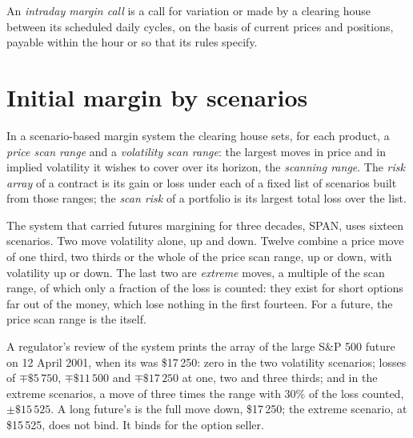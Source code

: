 \begin{definition}\label{def:m1:margin:intraday}
An \emph{intraday margin call} is a call for
variation or  made by a clearing house between its scheduled
daily cycles, on the basis of current prices and positions, payable within
the hour or so that its rules specify.
\end{definition}

\section{Initial margin by scenarios}

\begin{definition}\label{def:m1:margin:scan}
In a scenario-based margin system the clearing house sets, for each product,
a \emph{price scan range} and a \emph{volatility scan range}: the largest
moves in price and in implied volatility it wishes to cover over its
horizon, the \emph{scanning range}. The \emph{risk
array} of a contract is its gain or loss under each of a fixed list of
scenarios built from those ranges; the \emph{scan risk} of a portfolio is its
largest total loss over the list.
\end{definition}

The system that carried futures margining for three decades, SPAN, uses
sixteen scenarios. Two move volatility alone, up and down. Twelve combine a
price move of one third, two thirds or the whole of the price scan range, up
or down, with volatility up or down. The last two are \emph{extreme} moves, a
multiple of the scan range, of which only a fraction of the loss is counted:
they exist for short options far out of the money, which lose nothing in the
first fourteen. For a future, the price scan range is the 
itself.

\begin{example}\label{ex:m1:margin:array}
A regulator's review of the system prints the array of the large S\&P 500
future on 12 April 2001, when its  was \$17\,250: zero in
the two volatility scenarios; losses of $\mp\$5\,750$, $\mp\$11\,500$ and
$\mp\$17\,250$ at one, two and three thirds; and in the extreme scenarios, a
move of three times the range with 30\% of the loss counted, $\pm\$15\,525$. A
long future's  is the full move down, \$17\,250; the extreme
scenario, at \$15\,525, does not bind. It binds for the option seller.
\end{example}


